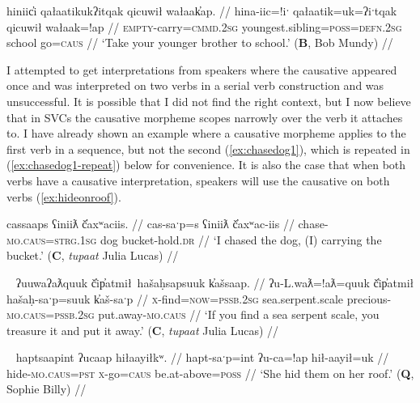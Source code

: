 \ex \label{ex:takebrothertoschool}
\begingl
\glpreamble hiniic̓i qałaatikukʔitqak qicuwił wałaak̓ap. //
\gla hina-iic=!iˑ qałaatik=uk=ʔiˑtqak qicuwił wałaak=!ap //
\glb \textsc{empty}-carry=\textsc{cmmd.2sg} youngest.sibling=\textsc{poss}=\textsc{defn.2sg} school go=\textsc{caus} //
\glft `Take your younger brother to school.' (\textbf{B}, Bob Mundy) //
\endgl
\xe

I attempted to get interpretations from speakers where the causative appeared once and was interpreted on two verbs in a serial verb construction and was unsuccessful. It is possible that I did not find the right context, but I now believe that in SVCs the causative morpheme scopes narrowly over the verb it attaches to. I have already shown an example where a causative morpheme applies to the first verb in a sequence, but not the second (\ref{ex:chasedog1}), which is repeated in (\ref{ex:chasedog1-repeat}) below for convenience. It is also the case that when both verbs have a causative interpretation, speakers will use the causative on both verbs (\ref{ex:hideonroof}).

\ex \label{ex:chasedog1-repeat}
\begingl
\glpreamble cassaaps ʕiniiƛ č̓axʷaciis. //
\gla cas-saˑp=s ʕiniiƛ č̓axʷac-iis //
\glb chase-\textsc{mo.caus}=\textsc{strg.1sg} dog bucket-hold.\textsc{dr} //
\glft `I chased the dog, (I) carrying the bucket.' (\textbf{C}, \textit{tupaat} Julia Lucas) //
\endgl
\xe

\ex~ \label{ex:makepreciousputaway}
\begingl
\glpreamble ʔuuwaʔaƛquuk č̓ip̓atmił\footnotemark\ hašaḥsapsuuk k̓ašsaap. //
\gla ʔu-L.waƛ=!aƛ=quuk č̓ip̓atmił hašaḥ-saˑp=suuk k̓aš-saˑp //
\glb \textsc{x}-find=\textsc{now}=\textsc{pssb.2sg} sea.serpent.scale precious-\textsc{mo.caus}=\textsc{pssb.2sg} put.away-\textsc{mo.caus} //
\glft `If you find a sea serpent scale, you treasure it and put it away.' (\textbf{C}, \textit{tupaat} Julia Lucas) //
\endgl
\xe


\ex~ \label{ex:hideonroof}
\begingl
\glpreamble haptsaapint ʔucaap hiłaayiłkʷ. //
\gla hapt-saˑp=int ʔu-ca=!ap hił-aayił=uk //
\glb hide-\textsc{mo.caus}=\textsc{pst} \textsc{x}-go=\textsc{caus} be.at-above=\textsc{poss} //
\glft `She hid them on her roof.' (\textbf{Q}, Sophie Billy) //
\endgl
\xe


